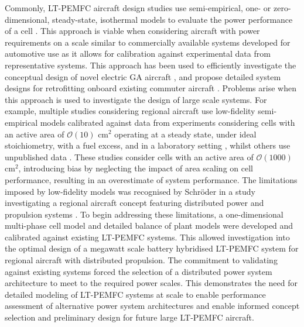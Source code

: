 Commonly, LT-PEMFC aircraft design studies use semi-empirical, one- or zero-dimensional, steady-state, isothermal  models to evaluate the power performance of a cell \cite{nicolayConceptualDesignOptimization2021b,  abukasimPerformanceFailureAnalysis2022a, ngHydrogenFuelCells2019a, parkRefinedSizingMethod2022, chiaramassaroOptimalDesignHydrogenpowered2024a, schmelcherHydrogenFuelCells2022a, sparanoFutureTechnologicalPotential2023a}.
This approach is viable when considering aircraft with  power requirements on a scale similar to commercially available systems developed for automotive use as it allows for calibration against experimental data from representative systems.
This approach has been used to efficiently investigate the conceptual design of novel electric GA aircraft \cite{nicolayConceptualDesignOptimization2021b}, and propose detailed system designs for retrofitting onboard existing commuter aircraft \cite{abukasimPerformanceFailureAnalysis2022a}.
Problems arise when this approach is used to investigate the design of large scale systems.
For example, multiple studies considering regional aircraft use low-fidelity semi-empirical models calibrated against data from experiments considering cells with an active area of $\mathcal{O}(10)$ cm$^2$ operating at a steady state, under ideal stoichiometry, with a fuel excess, and in a laboratory setting \cite{chiaramassaroOptimalDesignHydrogenpowered2024a, schmelcherHydrogenFuelCells2022a}, whilst others use unpublished data \cite{sparanoFutureTechnologicalPotential2023a}. %
These studies consider cells with an active area of $\mathcal{O}(1000)$ cm$^2$, introducing bias by neglecting the impact of area scaling on cell performance, resulting in an overestimate of system performance.
The limitations imposed by low-fidelity models was recognised by Schr\"oder \etal in a study investigating a regional aircraft concept featuring distributed power and propulsion systems \cite{schroderOptimalDesignProton2024}.
To begin addressing these limitations, a one-dimensional multi-phase cell model and detailed balance of plant models were developed and calibrated against existing LT-PEMFC systems.
This allowed investigation into the optimal design of a megawatt scale battery hybridised LT-PEMFC system for regional aircraft with distributed propulsion.
The commitment to validating against existing systems forced the selection of a distributed power system architecture to meet to the required power scales.
This demonstrates the need for detailed modeling of LT-PEMFC systems at scale to enable performance assessment of alternative power system architectures and enable informed concept selection and preliminary design for future large LT-PEMFC aircraft.
